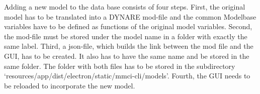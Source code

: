Adding a new model to the data base consists of four steps. First, the original model has to be translated into a DYNARE mod-file and the common Modelbase variables have to be defined as functions of the original model variables. Second, the mod-file must be stored under the model name in a folder with exactly the same label. Third, a json-file, which builds the link between the mod file and the GUI, has to be created. It also has to have the same  name and be stored in the same folder. The folder with both files has to be stored in the subdirectory `resources/app/dist/electron/static/mmci-cli/models'. Fourth, the GUI needs to be reloaded to incorporate the new model.\\



